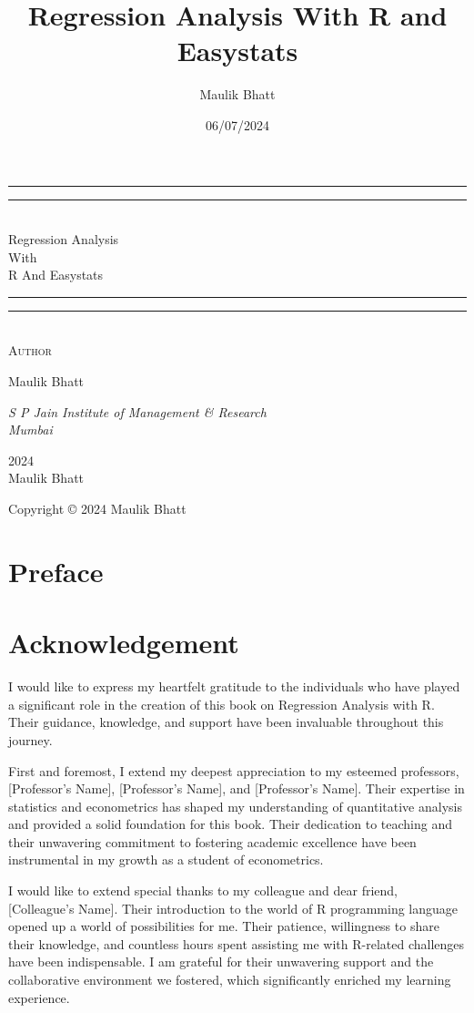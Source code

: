 \documentclass[
  letterpaper,
  paper =a4,
  twoside,
  openright,
  headsepline,
  footsepline,
  listof = totocnumbered,
  chapterprefix = true,
  firstiscover,
  parskip = full*]{scrbook}
\title{Regression Analysis With R and Easystats}
\author{Maulik Bhatt}
\date{06/07/2024}
\renewcommand{\maketitle}{
\begin{titlepage}
		\pagecolor{myblue}
		\color{white}
	\centering
	\vspace*{\baselineskip}
	\rule{\textwidth}{1.6pt}\vspace*{-\baselineskip}\vspace*{2pt}
	\rule{\textwidth}{0.4pt}\\[\baselineskip]
	{\LARGE Regression Analysis\\ With \\[0.3\baselineskip] R And Easystats}\\[0.2\baselineskip]
	\rule{\textwidth}{0.4pt}\vspace*{-\baselineskip}\vspace{3.2pt}
	\rule{\textwidth}{1.6pt}\\[\baselineskip]
	\scshape
	\vspace*{8\baselineskip}
	Author \\[\baselineskip]
	{\Large Maulik Bhatt \par}
	{\itshape S P Jain Institute of Management \& Research \\ Mumbai\par}
	\vfill
	{\scshape 2024} \\
	{\large Maulik Bhatt}\par%

\end{titlepage}
\nopagecolor%
\newpage
	
	\thispagestyle{empty}
	
	\begin{center}
		
		Copyright © 2024 Maulik Bhatt
		
	\end{center}
	\newpage
}
\renewcommand*\contentsname{Table of contents}
\newcommand\contentsname{Table of contents}
\begin{document}
\frontmatter
\maketitle

\renewcommand*\contentsname{Contents}
{
\hypersetup{linkcolor=}
\setcounter{tocdepth}{2}
\tableofcontents
}
\listoffigures
\listoftables

\mainmatter
{}

\chapter*{Preface}\label{preface}



\chapter*{Acknowledgement}\label{acknowledgement}


I would like to express my heartfelt gratitude to the individuals who
have played a significant role in the creation of this book on
Regression Analysis with R. Their guidance, knowledge, and support have
been invaluable throughout this journey.

First and foremost, I extend my deepest appreciation to my esteemed
professors, {[}Professor's Name{]}, {[}Professor's Name{]}, and
{[}Professor's Name{]}. Their expertise in statistics and econometrics
has shaped my understanding of quantitative analysis and provided a
solid foundation for this book. Their dedication to teaching and their
unwavering commitment to fostering academic excellence have been
instrumental in my growth as a student of econometrics.

I would like to extend special thanks to my colleague and dear friend,
{[}Colleague's Name{]}. Their introduction to the world of R programming
language opened up a world of possibilities for me. Their patience,
willingness to share their knowledge, and countless hours spent
assisting me with R-related challenges have been indispensable. I am
grateful for their unwavering support and the collaborative environment
we fostered, which significantly enriched my learning experience.
\end{document}

